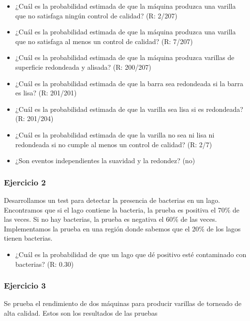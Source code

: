 \documentclass[
]{book}
\providecommand{\tightlist}{%
  \setlength{\itemsep}{0pt}\setlength{\parskip}{0pt}}
\begin{document}
\begin{itemize}
\item
  ¿Cuál es la probabilidad estimada de que la máquina produzca una varilla que no satisfaga ningún control de calidad? (R: 2/207)
\item
  ¿Cuál es la probabilidad estimada de que la máquina produzca una varilla que no satisfaga al menos un control de calidad? (R: 7/207)
\item
  ¿Cuál es la probabilidad estimada de que la máquina produzca varillas de superficie redondeada y alisada? (R: 200/207)
\item
  ¿Cuál es la probabilidad estimada de que la barra sea redondeada si la barra es lisa? (R: 201/201)
\item
  ¿Cuál es la probabilidad estimada de que la varilla sea lisa si es redondeada? (R: 201/204)
\item
  ¿Cuál es la probabilidad estimada de que la varilla no sea ni lisa ni redondeada si no cumple al menos un control de calidad? (R: 2/7)
\item
  ¿Son eventos independientes la suavidad y la redondez? (no)
\end{itemize}

\hypertarget{ejercicio-2-2}{%
\subsubsection{Ejercicio 2}\label{ejercicio-2-2}}

Desarrollamos un test para detectar la presencia de bacterias en un lago. Encontramos que si el lago contiene la bacteria, la prueba es positiva el 70\% de las veces. Si no hay bacterias, la prueba es negativa el 60\% de las veces. Implementamos la prueba en una región donde sabemos que el 20\% de los lagos tienen bacterias.

\begin{itemize}
\tightlist
\item
  ¿Cuál es la probabilidad de que un lago que dé positivo esté contaminado con bacterias? (R: 0.30)
\end{itemize}

\hypertarget{ejercicio-3}{%
\subsubsection{Ejercicio 3}\label{ejercicio-3}}

Se prueba el rendimiento de dos máquinas para producir varillas de torneado de alta calidad. Estos son los resultados de las pruebas
\end{document}
